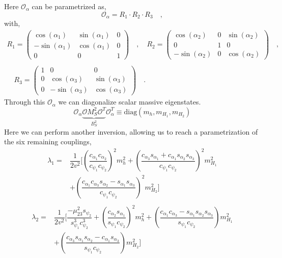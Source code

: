 Here $\mathcal{O}_\alpha$ can be parametrized as, 
\begin{equation}
\mathcal{O}_\alpha = R_1 \cdot R_2 \cdot R_3 \quad , 
\end{equation}
with, 
\begin{gather}
R_1 = \begin{pmatrix}
\cos(\alpha_1) & \sin(\alpha_1) & 0 \\
-\sin(\alpha_1) & \cos(\alpha_1) & 0 \\ 
0 & 0 & 1 
\end{pmatrix} \quad , \quad R_2 = \begin{pmatrix}
\cos(\alpha_2) & 0 & \sin(\alpha_2) \\ 
0 & 1 & 0 \\
-\sin(\alpha_2) & 0 & \cos(\alpha_2) 
\end{pmatrix} \quad ,\\ \\ \quad R_3 = \begin{pmatrix}
1 & 0 & 0 \\
0 & \cos(\alpha_3 ) & \sin(\alpha_3) \\
0 & -\sin(\alpha_3) & \cos(\alpha_3) 
\end{pmatrix} \quad . 
\end{gather}
Through this $\mathcal{O}_\alpha$ we can diagonalize scalar massive eigenstates. 
\begin{equation}
\mathcal{O}_\alpha \underbrace{\mathcal{O} M^2_S \mathcal{O}^T }_{B_S^2} \mathcal{O}_\alpha^T \equiv \text{diag}(m_h,m_{H_1},m_{H_2})
\end{equation}
Here we can perform another inversion, allowing us to reach a parametrization of the six remaining couplings, 
\begin{equation}
\begin{split}
\lambda_1 = & \dfrac{1}{2 v^2} \Bigg[ \left(\dfrac{c_{\alpha_1} c_{\alpha_2}}{c_{\psi_1} c_{\psi_2}} \right)^2 m_h^2 + \left( \dfrac{c_{\alpha_3} s_{\alpha_1} + c_{\alpha_1} s_{\alpha_2} s_{\alpha_3}}{c_{\psi_1} c_{\psi_2}} \right)^2 m_{H_1}^2 \\ & + \left( \dfrac{c_{\alpha_1} c_{\alpha_3} s_{\alpha_2} - s_{\alpha_1} s_{\alpha_3} }{c_{\psi_1} c_{\psi_2} } \right)^2 m_{H_2}^2 \Bigg] \\ 
\end{split} 
\end{equation}
%
\begin{equation}
\begin{split}
\lambda_2 = & \dfrac{1}{2 v^2} \Bigg[ \dfrac{ -\mu^2_{23} s_{\psi_2}}{s^3_{\psi_1} c^3_{\psi_2}} + \left( \dfrac{c_{\alpha_2} s_{\alpha_1}}{s_{\psi_1} c_{\psi_2}} \right)^2 m_h^2 + \left( \dfrac{c_{\alpha_1} c_{\alpha_3} - s_{\alpha_1} s_{\alpha_2} s_{\alpha_3}}{s_{\psi_1} c_{\psi_2}}\right) m_{H_1}^2  \\ & +  \left( \dfrac{c_{\alpha_3} s_{\alpha_1} s_{\alpha_2} - c_{\alpha_1} s_{\alpha_3}}{s_{\psi_1} c_{\psi_2} }\right)  m_{H_2}^2 \Bigg]  \\ 
\end{split} 
\end{equation}
